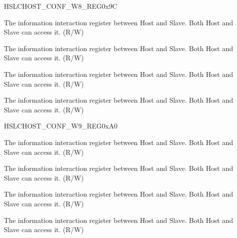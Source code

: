 \begin{register}{H}{SLCHOST\_CONF\_W8\_REG}{0x9C}\label{regdesc:SLCHOSTCONFW8REG}
%
%
%
%
\regnewline%
\begin{regdesc}\begin{reglist}
\item [SLCHOST\_CONF35]The information interaction register between Host and Slave. Both Host and Slave can access it. (R/W)
\item [SLCHOST\_CONF34]The information interaction register between Host and Slave. Both Host and Slave can access it. (R/W)
\item [SLCHOST\_CONF33]The information interaction register between Host and Slave. Both Host and Slave can access it. (R/W)
\item [SLCHOST\_CONF32]The information interaction register between Host and Slave. Both Host and Slave can access it. (R/W)
\end{reglist}\end{regdesc}
\end{register}


\begin{register}{H}{SLCHOST\_CONF\_W9\_REG}{0xA0}\label{regdesc:SLCHOSTCONFW9REG}
%
%
%
%
\regnewline%
\begin{regdesc}\begin{reglist}
\item [SLCHOST\_CONF39]The information interaction register between Host and Slave. Both Host and Slave can access it. (R/W)
\item [SLCHOST\_CONF38]The information interaction register between Host and Slave. Both Host and Slave can access it. (R/W)
\item [SLCHOST\_CONF37]The information interaction register between Host and Slave. Both Host and Slave can access it. (R/W)
\item [SLCHOST\_CONF36]The information interaction register between Host and Slave. Both Host and Slave can access it. (R/W)
\end{reglist}\end{regdesc}
\end{register}


